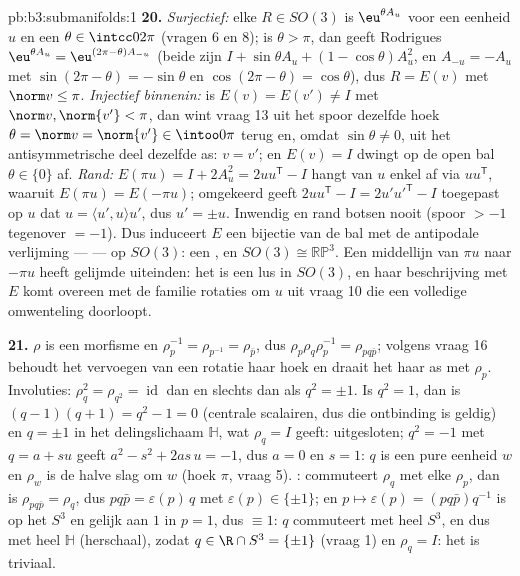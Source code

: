 \begin{solution}{pb:b3:submanifolds:1}
\textbf{20.} \emph{Surjectief:} elke $R \in SO(3)$ is $\eu^{\theta
A_u}$ voor een eenheid $u$ en een $\theta \in \intcc0{2\pi}$
(vragen 6 en 8); is $\theta > \pi$, dan geeft Rodrigues
$\eu^{\theta A_u} = \eu^{(2\pi - \theta)A_{-u}}$ (beide zijn $I +
\sin\theta A_u + (1 - \cos\theta)A_u^2$, en $A_{-u} = -A_u$ met
$\sin(2\pi - \theta) = -\sin\theta$ en $\cos(2\pi - \theta) =
\cos\theta$), dus $R = E(v)$ met $\norm v \leq \pi$.
\emph{Injectief binnenin:} is $E(v) = E(v') \neq I$ met $\norm v,
\norm{v'} < \pi$, dan wint vraag 13 uit het spoor dezelfde hoek
$\theta = \norm v = \norm{v'} \in \intoo0\pi$ terug en, omdat
$\sin\theta \neq 0$, uit het antisymmetrische deel dezelfde as:
$v = v'$; en $E(v) = I$ dwingt op de open bal $\theta \in \{0\}$
af. \emph{Rand:} $E(\pi u) = I + 2A_u^2 = 2uu^{\mathsf T} - I$
hangt van $u$ enkel af via $uu^{\mathsf T}$, waaruit $E(\pi u) =
E(-\pi u)$; omgekeerd geeft $2uu^{\mathsf T} - I = 2u'u'^{\mathsf
T} - I$ toegepast op $u$ dat $u = \langle u', u\rangle u'$, dus
$u' = \pm u$. Inwendig en rand botsen nooit (spoor $> -1$
tegenover $= -1$). Dus induceert $E$ een  bijectie van de
bal met de antipodale verlijming ---  --- op $SO(3)$: een
, en $SO(3) \cong \mathbb{RP}^3$. Een middellijn van
$\pi u$ naar $-\pi u$ heeft gelijmde uiteinden: het is een lus in
$SO(3)$, en haar beschrijving met $E$ komt overeen met de familie
rotaties om $u$ uit vraag 10 die een volledige omwenteling
doorloopt.

\textbf{21.} $\rho$ is een morfisme en $\rho_p^{-1} =
\rho_{p^{-1}} = \rho_{\bar p}$, dus $\rho_p\rho_q\rho_p^{-1} =
\rho_{pq\bar p}$; volgens vraag 16 behoudt het vervoegen van een
rotatie haar hoek en draait het haar as met $\rho_p$. Involuties:
$\rho_q^2 = \rho_{q^2} = \operatorname{id}$ dan en slechts dan
als $q^2 = \pm1$. Is $q^2 = 1$, dan is $(q - 1)(q + 1) = q^2 - 1
= 0$ (centrale scalairen, dus die ontbinding is geldig) en $q =
\pm1$ in het delingslichaam $\mathbb H$, wat $\rho_q = I$ geeft:
uitgesloten; $q^2 = -1$ met $q = a + su$ geeft $a^2 - s^2 +
2as\,u = -1$, dus $a = 0$ en $s = 1$: $q$ is een pure eenheid $w$
en $\rho_w$ is de halve slag om $w$ (hoek $\pi$, vraag 5).
: commuteert $\rho_q$ met elke $\rho_p$, dan is
$\rho_{pq\bar p} = \rho_q$, dus $pq\bar p = \varepsilon(p)\,q$
met $\varepsilon(p) \in \{\pm1\}$; en $p \mapsto \varepsilon(p) =
(pq\bar p)q^{-1}$ is  op het  $S^3$ en gelijk
aan $1$ in $p = 1$, dus $\equiv 1$: $q$ commuteert met heel
$S^3$, en dus met heel $\mathbb H$ (herschaal), zodat $q \in \R
\cap S^3 = \{\pm1\}$ (vraag 1) en $\rho_q = I$: het  is
triviaal.


\end{solution}
